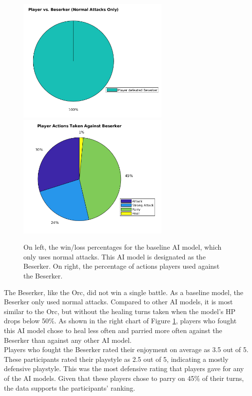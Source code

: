 \begin{figure}[H]
  \centering
  \includegraphics[width=7.5cm]{figures/beserkerWins.png}
  \includegraphics[width=7.5cm]{figures/actionsBeserker.png}
  \caption{On left, the win/loss percentages for the baseline AI model, which only uses normal attacks. This AI model is designated as the Beserker. On right, the percentage of actions players used against the Beserker.}
  \label{fig:pieBeserker}
\end{figure}

The Beserker, like the Orc, did not win a single battle. As a baseline model, the Beserker only used normal attacks. Compared to other AI models, it is most similar to the Orc, but without the healing turns taken when the model's HP drops below 50\%. As shown in the right chart of Figure \ref{fig:pieBeserker}, players who fought this AI model chose to heal less often and parried more often against the Beserker than against any other AI model.\\

Players who fought the Beserker rated their enjoyment on average as 3.5 out of 5. These participants rated their playstyle as 2.5 out of 5, indicating a mostly defensive playstyle. This was the most defensive rating that players gave for any of the AI models. Given that these players chose to parry on 45\% of their turns, the data supports the participants' ranking.


